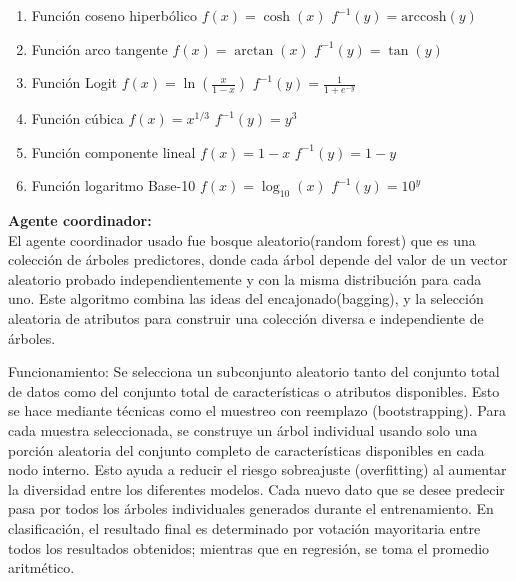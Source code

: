 \begin{enumerate}
        
            \item  Función coseno hiperbólico
            \( f(x) = \cosh(x) \)  
            \( f^{-1}(y) = \text{arccosh}(y) \)
        
            \item  Función arco tangente
            \( f(x) = \arctan(x) \)  
            \( f^{-1}(y) = \tan(y) \)
        
            \item  Función Logit
            \( f(x) = \ln\left(\frac{x}{1 - x}\right) \)  
            \( f^{-1}(y) = \frac{1}{1 + e^{-y}} \)
        
            \item  Función cúbica
            \( f(x) = x^{1/3} \)  
            \( f^{-1}(y) = y^3 \)
        
            \item Función componente lineal  
            \( f(x) = 1 - x \)  
            \( f^{-1}(y) = 1 - y \)
        
            \item  Función logaritmo Base-10   
            \( f(x) = \log_{10}(x) \)  
            \( f^{-1}(y) = 10^y \)

    \end{enumerate}


    \textbf{Agente coordinador:} \\

    El agente coordinador usado fue bosque aleatorio(random forest) que es una colección de árboles predictores, donde cada árbol depende del valor de un vector aleatorio probado
     independientemente y con la misma distribución para cada uno. Este algoritmo combina las ideas del encajonado(bagging), y la selección aleatoria 
     de atributos para construir una colección diversa e independiente de árboles. 
     
    Funcionamiento: Se selecciona un subconjunto aleatorio tanto del conjunto total de datos como del conjunto total de características o atributos disponibles. 
    Esto se hace mediante técnicas como el muestreo con reemplazo (bootstrapping). Para cada muestra seleccionada, se construye un árbol individual usando solo 
    una porción aleatoria del conjunto completo de características disponibles en cada nodo interno. Esto ayuda a reducir el riesgo sobreajuste (overfitting) al 
    aumentar la diversidad entre los diferentes modelos. Cada nuevo dato que se desee predecir pasa por todos los árboles individuales generados durante el 
    entrenamiento. En clasificación, el resultado final es determinado por votación mayoritaria entre todos los resultados obtenidos; mientras que en regresión, 
    se toma el promedio aritmético. \\

